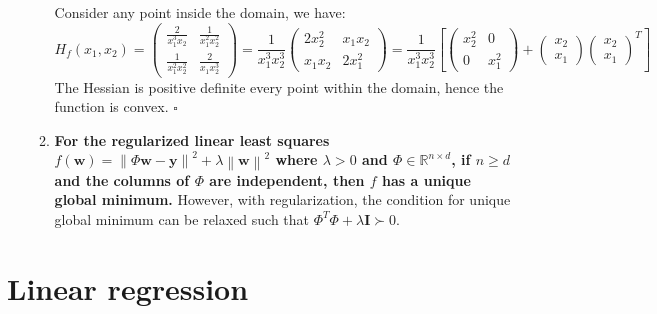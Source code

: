 \documentclass[a4paper, 10pt]{article}
\begin{document}
\begin{enumerate}[label=(\alph*)]
\begin{enumerate}[label=(\arabic*)]
    Consider any point inside the domain, we have:
    \begin{equation}
        H_f(x_1, x_2) = \begin{pmatrix} \frac{2}{x_1^3 x_2} & \frac{1}{x_1^2 x_2^2} \\ \frac{1}{x_1^2 x_2^2} & \frac{2}{x_1 x_2^3} \end{pmatrix} = \frac{1}{x_1^3 x_2^3} \begin{pmatrix} 2x_2^2 & x_1x_2 \\ x_1x_2 & 2x_1^2 \end{pmatrix} = \frac{1}{x_1^3 x_2^3} \left[
        \begin{pmatrix}
            x_2^2 & 0 \\ 0 & x_1^2
        \end{pmatrix} + 
        \begin{pmatrix} x_2 \\ x_1 \end{pmatrix}\begin{pmatrix} x_2 \\ x_1 \end{pmatrix}^T\right]
    \end{equation}
    The Hessian is positive definite every point within the domain, hence the function is convex. $\square$
    
    \item \textbf{For the regularized linear least squares $f(\mathbf{w}) = \left\| \Phi \mathbf{w} - \mathbf{y} \right\|^2 + \lambda \left\| \mathbf{w} \right\|^2$ where $\lambda >0$ and $\Phi \in \mathbb{R}^{n\times d}$, if $n\geq d$ and the columns of $\Phi$ are independent, then $f$ has a unique global minimum.} However, with regularization, the condition for unique global minimum can be relaxed such that $\Phi^T\Phi + \lambda \mathbf{I} \succ 0$.
    
\end{enumerate}

\end{enumerate}

\section{Linear regression}
\end{document}
